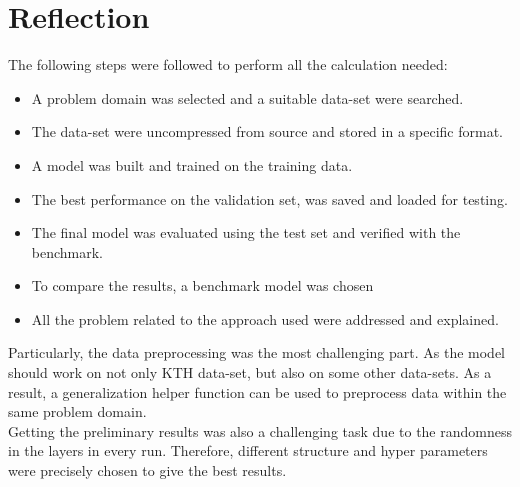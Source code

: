 \section{Reflection}
\hspace{5mm} The following steps were followed to perform all the calculation needed:\\
\begin{itemize}
    \item A problem domain was selected and a suitable data-set were searched.
    \item The data-set were uncompressed from source and stored in a specific format.
    \item A model was built and trained on the training data. 
    \item The best performance on the validation set, was saved and loaded for testing.
    \item The final model was evaluated using the test set and verified with the benchmark.
    \item To compare the results, a benchmark model was chosen
    \item All the problem related to the approach used were addressed and explained.
    
\end{itemize}
\hspace{5mm} Particularly, the data preprocessing was the most challenging part. As the model should work on not only KTH data-set, but also on some other data-sets. As a result, a generalization helper function can be used to preprocess data within the same problem domain.\\

Getting the preliminary results was also a challenging task due to the randomness in the layers in every run. Therefore, different structure and hyper parameters were precisely chosen to give the best results.

